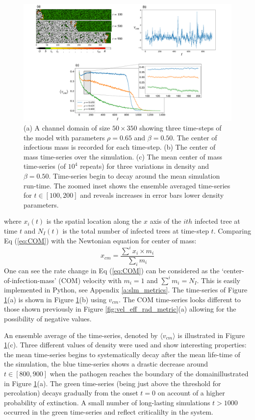 \begin{figure}
    \centering
    \includegraphics[scale=0.30]{chapter3/figures/figure10.pdf}
    \caption{(a) A channel domain of size $50\times350$ showing three time-steps of the model with parameters $\rho=0.65$ and $\beta=0.50$. The center of infectious mass is recorded for each time-step. (b) The center of mass time-series over the simulation. (c) The mean center of mass time-series (of $10^4$ repeats) for three variations in density and $\beta=0.50$. Time-series begin to decay around the mean simulation run-time.  The zoomed inset shows the ensemble averaged time-series for $t\in[100, 200]$ and reveals increases in error bars lower density parameters.}
    \label{fig:ews-primer}
\end{figure}

where $x_i(t)$ is the spatial location along the $x$ axis of the $ith$ infected tree at %
time $t$ and $N_I(t)$ is the total number of infected trees at time-step $t$. %
Comparing Eq (\ref{eq:COM}) with the Newtonian equation for center of mass: %
\begin{equation}
    x_{cm} = \frac{\sum^i x_i\times m_i}{\sum_i m_i}
\end{equation}
One can see the rate change in Eq (\ref{eq:COM}) can be considered as the `center-of-infection-mass' (COM) velocity %
with $m_i=1$ and $\sum^im_i= N_I$. %
This is easily implemented in Python, see Appendix \ref{a:slm_metrics}. %
The time-series of Figure \ref{fig:ews-primer}(a) is shown in Figure \ref{fig:ews-primer}(b) using $v_{cm}$. %
The COM time-series looks different to those shown previously in Figure \ref{fig:vel_eff_rad_metric}(a) allowing for the possibility of negative values. %

An ensemble average of the time-series, denoted by $\langle v_{cm}\rangle$ is illustrated in Figure \ref{fig:ews-primer}(c). %
Three different values of density were used and show  interesting properties: %
the mean time-series begins to systematically decay after the mean life-time of the simulation, %
the blue time-series shows a drastic decrease around $t \in [800, 900]$ when the pathogen %
reaches the boundary of the domain\textemdash illustrated in Figure \ref{fig:ews-primer}(a). %
The green time-series (being just above the threshold for percolation) decays gradually from %
the onset $t=0$ on account of a higher probability of extinction. %
A small number of long-lasting simulations $t>1000$ occurred in the green time-series and reflect criticalilty in the system. %

